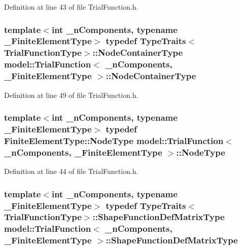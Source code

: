 Definition at line 43 of file Trial\+Function.\+h.

\hypertarget{classmodel_1_1_trial_function_a830ac33c6efd0f2022269cfc2c522388}{}
\subsubsection[{Node\+Container\+Type}]{\setlength{\rightskip}{0pt plus 5cm}template$<$int \+\_\+n\+Components, typename \+\_\+\+Finite\+Element\+Type$>$ typedef {\bf Type\+Traits}$<${\bf Trial\+Function\+Type}$>$\+::{\bf Node\+Container\+Type} {\bf model\+::\+Trial\+Function}$<$ \+\_\+n\+Components, \+\_\+\+Finite\+Element\+Type $>$\+::{\bf Node\+Container\+Type}}\label{classmodel_1_1_trial_function_a830ac33c6efd0f2022269cfc2c522388}


Definition at line 49 of file Trial\+Function.\+h.

\hypertarget{classmodel_1_1_trial_function_abfb27d5003b203df9a1a34f81efb49c1}{}
\subsubsection[{Node\+Type}]{\setlength{\rightskip}{0pt plus 5cm}template$<$int \+\_\+n\+Components, typename \+\_\+\+Finite\+Element\+Type$>$ typedef Finite\+Element\+Type\+::\+Node\+Type {\bf model\+::\+Trial\+Function}$<$ \+\_\+n\+Components, \+\_\+\+Finite\+Element\+Type $>$\+::{\bf Node\+Type}}\label{classmodel_1_1_trial_function_abfb27d5003b203df9a1a34f81efb49c1}


Definition at line 44 of file Trial\+Function.\+h.

\hypertarget{classmodel_1_1_trial_function_a91023734ad775d5608a8672e9fe00f5c}{}
\subsubsection[{Shape\+Function\+Def\+Matrix\+Type}]{\setlength{\rightskip}{0pt plus 5cm}template$<$int \+\_\+n\+Components, typename \+\_\+\+Finite\+Element\+Type$>$ typedef {\bf Type\+Traits}$<${\bf Trial\+Function\+Type}$>$\+::{\bf Shape\+Function\+Def\+Matrix\+Type} {\bf model\+::\+Trial\+Function}$<$ \+\_\+n\+Components, \+\_\+\+Finite\+Element\+Type $>$\+::{\bf Shape\+Function\+Def\+Matrix\+Type}}\label{classmodel_1_1_trial_function_a91023734ad775d5608a8672e9fe00f5c}



